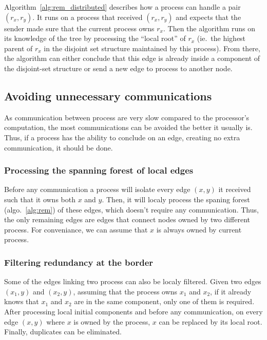 \documentclass[12px]{article}
\begin{document}
      Algorithm~\ref{alg:rem_distributed} describes how a process can handle a pair $(r_x, r_y)$.
      It runs on a process that received $(r_x, r_y)$ and expects that the sender made sure that the current process owns $r_x$. Then the algorithm runs on its knowledge of the tree by processing the ``local root'' of $r_x$ (ie.\ the highest parent of $r_x$ in the disjoint set structure maintained by this process).
      From there, the algorithm can either conclude that this edge is already inside a component of the disjoint-set structure or send a new edge to process to another node.

    \subsection{Avoiding unnecessary communications}
      As communication between process are very slow compared to the processor's computation, the most communications can be avoided the better it usually is.
      Thus, if a process has the ability to conclude on an edge, creating no extra communication, it should be done.

      \subsubsection{Processing the spanning forest of local edges}
        Before any communication a process will isolate every edge $(x, y)$ it received such that it owns both $x$ and $y$.
        Then, it will localy process the spaning forest (algo.~\ref{alg:rem}) of these edges, which doesn't require any communication.
        Thus, the only remaining edges are edges that connect nodes owned by two different process. For conveniance, we can assume that $x$ is always owned by current process.

      \subsubsection{Filtering redundancy at the border}
        Some of the edges linking two process can also be localy filtered.
        Given two edges $(x_1, y)$ and $(x_2, y)$, assuming that the process owns $x_1$ and $x_2$, if it already knows that $x_1$ and $x_2$ are in the same component, only one of them is required.
        After processing local initial components and before any communication, on every edge $(x, y)$ where $x$ is owned by the process, $x$ can be replaced by its local root. Finally, duplicates can be eliminated.
\end{document}
